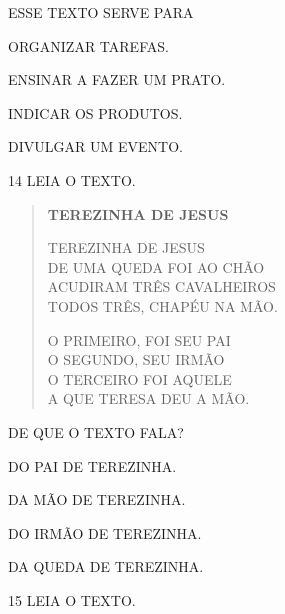 ESSE TEXTO SERVE PARA

\begin{escolha}
\item ORGANIZAR TAREFAS.

\item ENSINAR A FAZER UM PRATO.

\item INDICAR OS PRODUTOS.

\item DIVULGAR UM EVENTO.
\end{escolha}

\num{14} LEIA O TEXTO. \enlargethispage{2\baselineskip}

\begin{myquote}
\begin{verse}
\textbf{TEREZINHA DE JESUS}

TEREZINHA DE JESUS\\
DE UMA QUEDA FOI AO CHÃO\\
ACUDIRAM TRÊS CAVALHEIROS\\
TODOS TRÊS, CHAPÉU NA MÃO.


O PRIMEIRO, FOI SEU PAI\\
O SEGUNDO, SEU IRMÃO\\
O TERCEIRO FOI AQUELE\\
A QUE TERESA DEU A MÃO.

\end{verse}
\end{myquote}

DE QUE O TEXTO FALA?

\begin{escolha}[itemsep=-5pt]
\item DO PAI DE TEREZINHA.

\item DA MÃO DE TEREZINHA.

\item DO IRMÃO DE TEREZINHA.

\item DA QUEDA DE TEREZINHA.
\end{escolha}

\num{15} LEIA O TEXTO. \enlargethispage{2\baselineskip}

